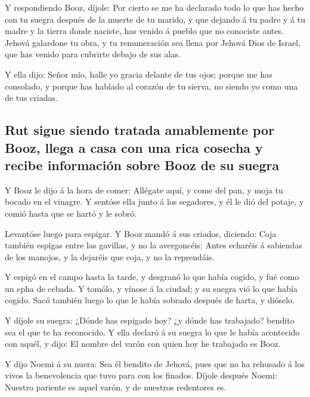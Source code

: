 Y respondiendo Booz, díjole: Por cierto se me ha declarado
todo lo que has hecho con tu suegra después de la muerte de tu marido, y
que dejando á tu padre y á tu madre y la tierra donde naciste, has
venido á pueblo que no conociste antes.  Jehová galardone
tu obra, y tu remuneración sea llena por Jehová Dios de Israel, que has
venido para cubrirte debajo de sus alas.

 Y ella dijo: Señor mío, halle yo gracia delante de tus
ojos; porque me has consolado, y porque has hablado al corazón de tu
sierva, no siendo yo como una de tus criadas.

\hypertarget{rut-sigue-siendo-tratada-amablemente-por-booz-llega-a-casa-con-una-rica-cosecha-y-recibe-informaciuxf3n-sobre-booz-de-su-suegra}{%
\subsection{Rut sigue siendo tratada amablemente por Booz, llega a casa
con una rica cosecha y recibe información sobre Booz de su
suegra}\label{rut-sigue-siendo-tratada-amablemente-por-booz-llega-a-casa-con-una-rica-cosecha-y-recibe-informaciuxf3n-sobre-booz-de-su-suegra}}

 Y Booz le dijo á la hora de comer: Allégate aquí, y come
del pan, y moja tu bocado en el vinagre. Y sentóse ella junto á los
segadores, y él le dió del potaje, y comió hasta que se hartó y le
sobró.

 Levantóse luego para espigar. Y Booz mandó á sus criados,
diciendo: Coja también espigas entre las gavillas, y no la avergoncéis;
 Antes echaréis á sabiendas de los manojos, y la dejaréis
que coja, y no la reprendáis.

 Y espigó en el campo hasta la tarde, y desgranó lo que
había cogido, y fué como un epha de cebada.  Y tomólo, y
vínose á la ciudad; y su suegra vió lo que había cogido. Sacó también
luego lo que le había sobrado después de harta, y dióselo.

 Y díjole su suegra: ¿Dónde has espigado hoy? ¿y dónde has
trabajado? bendito sea el que te ha reconocido. Y ella declaró á su
suegra lo que le había acontecido con aquél, y dijo: El nombre del varón
con quien hoy he trabajado es Booz.

 Y dijo Noemi á su nuera: Sea él bendito de Jehová, pues
que no ha rehusado á los vivos la benevolencia que tuvo para con los
finados. Díjole después Noemi: Nuestro pariente es aquel varón, y de
nuestros redentores es.


